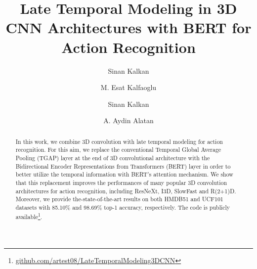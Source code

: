 \documentclass[runningheads]{llncs}
\begin{document}
\pagestyle{headings}
\mainmatter
\def\ECCVSubNumber{13}  

\title{Late Temporal Modeling in 3D CNN Architectures with BERT for Action Recognition} 

\begin{comment}
\titlerunning{ECCV-20 submission ID \ECCVSubNumber} 
\authorrunning{ECCV-20 submission ID \ECCVSubNumber} 
\author{Anonymous ECCV submission}
\institute{Paper ID \ECCVSubNumber}
\end{comment}


\author{   \and
Sinan Kalkan \and
{}  }
\author{M. Esat Kalfaoglu \and
Sinan Kalkan \and
A. Aydin Alatan }
\maketitle

\begin{abstract}
In this work, we combine 3D convolution with late temporal modeling for action recognition. For this aim, we replace the conventional Temporal Global Average Pooling (TGAP) layer at the end of 3D convolutional architecture with the Bidirectional Encoder Representations from Transformers (BERT) layer in order to better utilize the temporal information with BERT's attention mechanism. We show that this replacement improves the performances of many popular 3D convolution architectures for action recognition, including ResNeXt, I3D, SlowFast and R(2+1)D. Moreover, we provide the-state-of-the-art results on both HMDB51 and UCF101 datasets with 85.10\% and 98.69\% top-1 accuracy, respectively. The code is publicly available\footnote{\href{https://github.com/artest08/LateTemporalModeling3DCNN}{\color{magenta} github.com/artest08/LateTemporalModeling3DCNN}}.
\end{abstract}
\end{document}
